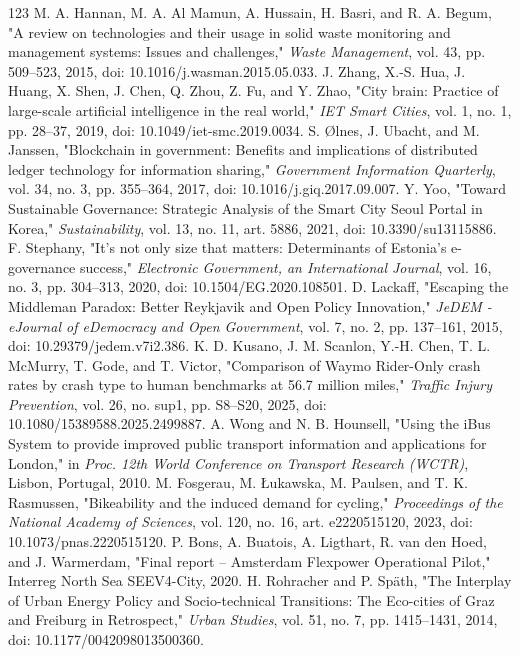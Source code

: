\documentclass[journal]{IEEEtran}
\begin{document}
\begin{thebibliography}{123}
 M. A. Hannan, M. A. Al Mamun, A. Hussain, H. Basri, and R. A. Begum, "A review on technologies and their usage in solid waste monitoring and management systems: Issues and challenges," \emph{Waste Management}, vol. 43, pp. 509--523, 2015, doi: 10.1016/j.wasman.2015.05.033.
 J. Zhang, X.-S. Hua, J. Huang, X. Shen, J. Chen, Q. Zhou, Z. Fu, and Y. Zhao, "City brain: Practice of large-scale artificial intelligence in the real world," \emph{IET Smart Cities}, vol. 1, no. 1, pp. 28--37, 2019, doi: 10.1049/iet-smc.2019.0034.
 S. \O{}lnes, J. Ubacht, and M. Janssen, "Blockchain in government: Benefits and implications of distributed ledger technology for information sharing," \emph{Government Information Quarterly}, vol. 34, no. 3, pp. 355--364, 2017, doi: 10.1016/j.giq.2017.09.007.
 Y. Yoo, "Toward Sustainable Governance: Strategic Analysis of the Smart City Seoul Portal in Korea," \emph{Sustainability}, vol. 13, no. 11, art. 5886, 2021, doi: 10.3390/su13115886.
 F. Stephany, "It's not only size that matters: Determinants of Estonia's e-governance success," \emph{Electronic Government, an International Journal}, vol. 16, no. 3, pp. 304--313, 2020, doi: 10.1504/EG.2020.108501.
 D. Lackaff, "Escaping the Middleman Paradox: Better Reykjavik and Open Policy Innovation," \emph{JeDEM - eJournal of eDemocracy and Open Government}, vol. 7, no. 2, pp. 137--161, 2015, doi: 10.29379/jedem.v7i2.386.
 K. D. Kusano, J. M. Scanlon, Y.-H. Chen, T. L. McMurry, T. Gode, and T. Victor, "Comparison of Waymo Rider-Only crash rates by crash type to human benchmarks at 56.7 million miles," \emph{Traffic Injury Prevention}, vol. 26, no. sup1, pp. S8--S20, 2025, doi: 10.1080/15389588.2025.2499887.
 A. Wong and N. B. Hounsell, "Using the iBus System to provide improved public transport information and applications for London," in \emph{Proc. 12th World Conference on Transport Research (WCTR)}, Lisbon, Portugal, 2010.
 M. Fosgerau, M. \L{}ukawska, M. Paulsen, and T. K. Rasmussen, "Bikeability and the induced demand for cycling," \emph{Proceedings of the National Academy of Sciences}, vol. 120, no. 16, art. e2220515120, 2023, doi: 10.1073/pnas.2220515120.
 P. Bons, A. Buatois, A. Ligthart, R. van den Hoed, and J. Warmerdam, "Final report -- Amsterdam Flexpower Operational Pilot," Interreg North Sea SEEV4-City, 2020.
 H. Rohracher and P. Sp\"ath, "The Interplay of Urban Energy Policy and Socio-technical Transitions: The Eco-cities of Graz and Freiburg in Retrospect," \emph{Urban Studies}, vol. 51, no. 7, pp. 1415--1431, 2014, doi: 10.1177/0042098013500360.

\end{thebibliography}
\end{document}
